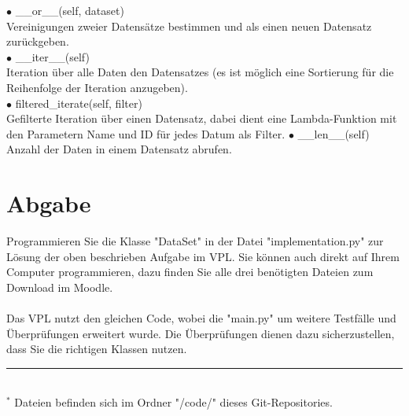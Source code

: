 \documentclass{article}
\begin{document}
			$\bullet$ \_\_or\_\_(self, dataset)\\
			\hspace*{1cm} Vereinigungen zweier Datensätze bestimmen und als einen neuen Datensatz zurückgeben.\\
			$\bullet$ \_\_iter\_\_(self)\\
			\hspace*{1cm} Iteration über alle Daten den Datensatzes (es ist möglich eine Sortierung für die Reihenfolge der Iteration anzugeben).\\ 
			$\bullet$ filtered\_iterate(self, filter)\\
			\hspace*{1cm} Gefilterte Iteration über einen Datensatz, dabei dient eine Lambda-Funktion mit den Parametern Name und ID für jedes Datum als Filter.
			$\bullet$ \_\_len\_\_(self)\\
			\hspace*{1cm} Anzahl der Daten in einem Datensatz abrufen.\\
	
	\section{Abgabe}
		Programmieren Sie die Klasse "DataSet" in der Datei "implementation.py" zur Lösung der oben beschrieben Aufgabe im VPL.
		Sie können auch direkt auf Ihrem Computer programmieren, dazu finden Sie alle drei benötigten Dateien zum Download im Moodle.\\
		\\
		Das VPL nutzt den gleichen Code, wobei die "main.py" um weitere Testfälle und Überprüfungen erweitert wurde.
		Die Überprüfungen dienen dazu sicherzustellen, dass Sie die richtigen Klassen nutzen.\\
	
		\hrule\hfill\\[0.2cm]
		$^*$ Dateien befinden sich im Ordner "/code/" dieses Git-Repositories.\\
\end{document}
